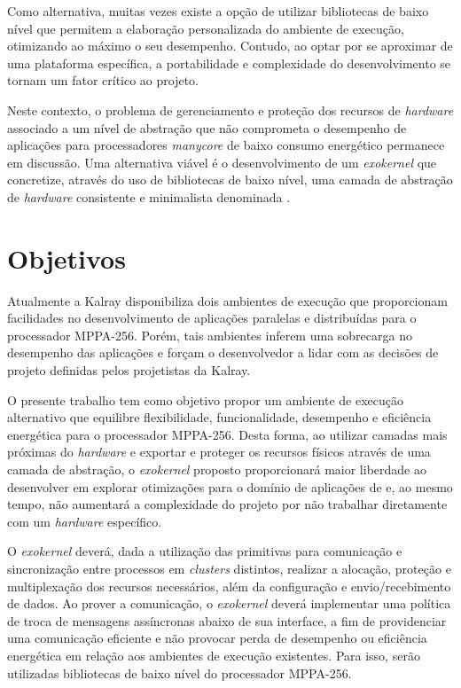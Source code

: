 \documentclass[
  12pt,       %
  openright,      %
  twoside,      %
  a4paper,      %
  english,      %
  brazil,       %
  ]{abntex2}
\begin{document}
    Como alternativa, muitas vezes existe a opção de utilizar bibliotecas
    de baixo nível que permitem a elaboração personalizada do ambiente de
    execução, otimizando ao máximo o seu desempenho. Contudo, ao optar por se
    aproximar de uma plataforma específica, a portabilidade e complexidade do
    desenvolvimento se tornam um fator crítico ao projeto.
    
    Neste contexto, o problema de gerenciamento e proteção dos recursos de
    \textit{hardware} associado a um nível de abstração que não comprometa o desempenho
    de aplicações para processadores \textit{manycore} de baixo consumo
    energético permanece em discussão.
    Uma alternativa viável é o desenvolvimento de um \textit{exokernel} que
    concretize, através do uso de bibliotecas de baixo nível, uma camada de
    abstração de \textit{hardware} consistente e minimalista denominada \hal.

\chapter{Objetivos}
\label{cap:objetivos}

    Atualmente a Kalray disponibiliza dois ambientes de execução que
    proporcionam facilidades no desenvolvimento de aplicações paralelas
    e distribuídas para o processador MPPA-256.
    Porém, tais ambientes inferem uma sobrecarga no desempenho das aplicações
    e forçam o desenvolvedor a lidar com as decisões de projeto definidas
    pelos projetistas da Kalray.
    
    O presente trabalho tem como objetivo propor um ambiente de execução alternativo que
    equilibre flexibilidade, funcionalidade, desempenho e eficiência energética
    para o processador MPPA-256.
    Desta forma, ao utilizar camadas mais próximas do \textit{hardware} e exportar e
    proteger os recursos físicos através de uma camada de abstração,
    o \textit{exokernel} proposto proporcionará maior liberdade ao
    desenvolver em explorar otimizações para o domínio de aplicações de \hpc e,
    ao mesmo tempo, não aumentará a complexidade do projeto por
    não trabalhar diretamente com um \textit{hardware} específico.
    
    O \textit{exokernel} deverá, dada a utilização das primitivas \ipc para
    comunicação e sincronização entre processos em \textit{clusters} distintos,
    realizar a alocação, proteção e multiplexação dos recursos necessários, 
    além da configuração e envio/recebimento de dados.
    Ao prover a comunicação, o \textit{exokernel} deverá implementar uma 
    política de troca de mensagens assíncronas abaixo de sua interface, 
    a fim de providenciar uma comunicação eficiente e não provocar perda de
    desempenho ou eficiência energética em relação aos ambientes de execução
    existentes.
    Para isso, serão utilizadas bibliotecas de baixo nível do processador MPPA-256.
    
\end{document}

